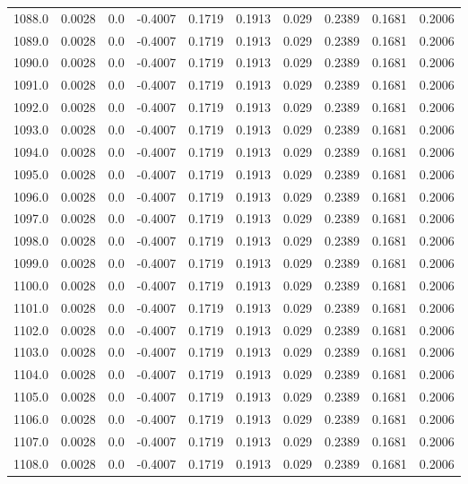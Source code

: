 \begin{longtable}{lrrrrrrrrr}
1088.0 & 0.0028 & 0.0 & -0.4007 & 0.1719 & 0.1913 & 0.029 & 0.2389 & 0.1681 & 0.2006 \\
1089.0 & 0.0028 & 0.0 & -0.4007 & 0.1719 & 0.1913 & 0.029 & 0.2389 & 0.1681 & 0.2006 \\
1090.0 & 0.0028 & 0.0 & -0.4007 & 0.1719 & 0.1913 & 0.029 & 0.2389 & 0.1681 & 0.2006 \\
1091.0 & 0.0028 & 0.0 & -0.4007 & 0.1719 & 0.1913 & 0.029 & 0.2389 & 0.1681 & 0.2006 \\
1092.0 & 0.0028 & 0.0 & -0.4007 & 0.1719 & 0.1913 & 0.029 & 0.2389 & 0.1681 & 0.2006 \\
1093.0 & 0.0028 & 0.0 & -0.4007 & 0.1719 & 0.1913 & 0.029 & 0.2389 & 0.1681 & 0.2006 \\
1094.0 & 0.0028 & 0.0 & -0.4007 & 0.1719 & 0.1913 & 0.029 & 0.2389 & 0.1681 & 0.2006 \\
1095.0 & 0.0028 & 0.0 & -0.4007 & 0.1719 & 0.1913 & 0.029 & 0.2389 & 0.1681 & 0.2006 \\
1096.0 & 0.0028 & 0.0 & -0.4007 & 0.1719 & 0.1913 & 0.029 & 0.2389 & 0.1681 & 0.2006 \\
1097.0 & 0.0028 & 0.0 & -0.4007 & 0.1719 & 0.1913 & 0.029 & 0.2389 & 0.1681 & 0.2006 \\
1098.0 & 0.0028 & 0.0 & -0.4007 & 0.1719 & 0.1913 & 0.029 & 0.2389 & 0.1681 & 0.2006 \\
1099.0 & 0.0028 & 0.0 & -0.4007 & 0.1719 & 0.1913 & 0.029 & 0.2389 & 0.1681 & 0.2006 \\
1100.0 & 0.0028 & 0.0 & -0.4007 & 0.1719 & 0.1913 & 0.029 & 0.2389 & 0.1681 & 0.2006 \\
1101.0 & 0.0028 & 0.0 & -0.4007 & 0.1719 & 0.1913 & 0.029 & 0.2389 & 0.1681 & 0.2006 \\
1102.0 & 0.0028 & 0.0 & -0.4007 & 0.1719 & 0.1913 & 0.029 & 0.2389 & 0.1681 & 0.2006 \\
1103.0 & 0.0028 & 0.0 & -0.4007 & 0.1719 & 0.1913 & 0.029 & 0.2389 & 0.1681 & 0.2006 \\
1104.0 & 0.0028 & 0.0 & -0.4007 & 0.1719 & 0.1913 & 0.029 & 0.2389 & 0.1681 & 0.2006 \\
1105.0 & 0.0028 & 0.0 & -0.4007 & 0.1719 & 0.1913 & 0.029 & 0.2389 & 0.1681 & 0.2006 \\
1106.0 & 0.0028 & 0.0 & -0.4007 & 0.1719 & 0.1913 & 0.029 & 0.2389 & 0.1681 & 0.2006 \\
1107.0 & 0.0028 & 0.0 & -0.4007 & 0.1719 & 0.1913 & 0.029 & 0.2389 & 0.1681 & 0.2006 \\
1108.0 & 0.0028 & 0.0 & -0.4007 & 0.1719 & 0.1913 & 0.029 & 0.2389 & 0.1681 & 0.2006 \\

\end{longtable}
